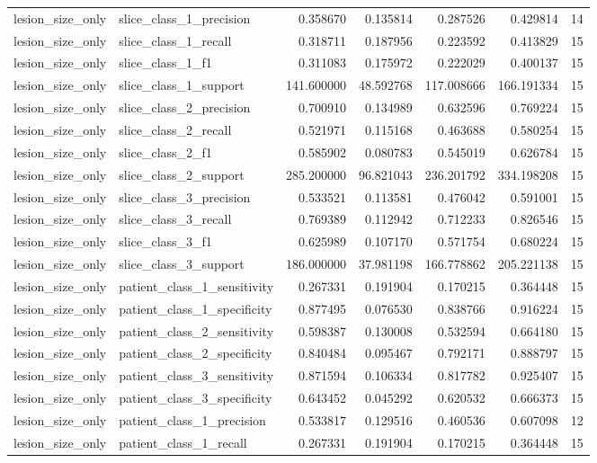 \begin{tabular}{llrrrrr}
lesion_size_only & slice_class_1_precision & 0.358670 & 0.135814 & 0.287526 & 0.429814 & 14 \\
lesion_size_only & slice_class_1_recall & 0.318711 & 0.187956 & 0.223592 & 0.413829 & 15 \\
lesion_size_only & slice_class_1_f1 & 0.311083 & 0.175972 & 0.222029 & 0.400137 & 15 \\
lesion_size_only & slice_class_1_support & 141.600000 & 48.592768 & 117.008666 & 166.191334 & 15 \\
lesion_size_only & slice_class_2_precision & 0.700910 & 0.134989 & 0.632596 & 0.769224 & 15 \\
lesion_size_only & slice_class_2_recall & 0.521971 & 0.115168 & 0.463688 & 0.580254 & 15 \\
lesion_size_only & slice_class_2_f1 & 0.585902 & 0.080783 & 0.545019 & 0.626784 & 15 \\
lesion_size_only & slice_class_2_support & 285.200000 & 96.821043 & 236.201792 & 334.198208 & 15 \\
lesion_size_only & slice_class_3_precision & 0.533521 & 0.113581 & 0.476042 & 0.591001 & 15 \\
lesion_size_only & slice_class_3_recall & 0.769389 & 0.112942 & 0.712233 & 0.826546 & 15 \\
lesion_size_only & slice_class_3_f1 & 0.625989 & 0.107170 & 0.571754 & 0.680224 & 15 \\
lesion_size_only & slice_class_3_support & 186.000000 & 37.981198 & 166.778862 & 205.221138 & 15 \\
lesion_size_only & patient_class_1_sensitivity & 0.267331 & 0.191904 & 0.170215 & 0.364448 & 15 \\
lesion_size_only & patient_class_1_specificity & 0.877495 & 0.076530 & 0.838766 & 0.916224 & 15 \\
lesion_size_only & patient_class_2_sensitivity & 0.598387 & 0.130008 & 0.532594 & 0.664180 & 15 \\
lesion_size_only & patient_class_2_specificity & 0.840484 & 0.095467 & 0.792171 & 0.888797 & 15 \\
lesion_size_only & patient_class_3_sensitivity & 0.871594 & 0.106334 & 0.817782 & 0.925407 & 15 \\
lesion_size_only & patient_class_3_specificity & 0.643452 & 0.045292 & 0.620532 & 0.666373 & 15 \\
lesion_size_only & patient_class_1_precision & 0.533817 & 0.129516 & 0.460536 & 0.607098 & 12 \\
lesion_size_only & patient_class_1_recall & 0.267331 & 0.191904 & 0.170215 & 0.364448 & 15 \\

\end{tabular}
